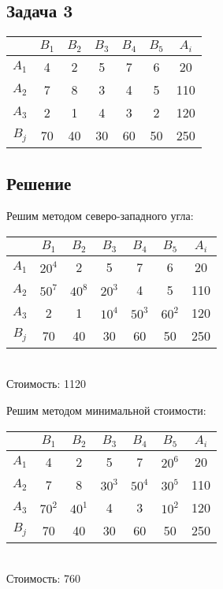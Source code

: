 \documentclass[12pt]{article}
\begin{document}
\subsection*{Задача 3}
\begin{table}[h!]
\begin{center}
\begin{tabular}{|c|c|c|c|c|c|c|}
\hline
           & $B_1$ & $B_2$ & $B_3$ & $B_4$ & $B_5$ & $A_i$	\\
\hline
 $A_1$ & 4 & 2 & 5 & 7 & 6 & 20	\\
\hline
 $A_2$ & 7 & 8 & 3 & 4 & 5 & 110	\\
\hline
 $A_3$ & 2 & 1 & 4 & 3 & 2 & 120	\\
\hline
 $B_j$ & 70 & 40 & 30 & 60 & 50 & 250	\\
\hline
\end{tabular}
\end{center}
\end{table} 
\subsection*{Решение}
Решим методом северо-западного угла:
\begin{table}[h!]
\begin{center}
\begin{tabular}{|c|c|c|c|c|c|c|}
\hline
           & $B_1$ & $B_2$ & $B_3$ & $B_4$ & $B_5$ & $A_i$	\\
\hline
 $A_1$ & $20^4$ & 2 & 5 & 7 & 6 & 20	\\
\hline
 $A_2$ & $50^7$ & $40^8$ & $20^3$ & 4 & 5 & 110	\\
\hline
 $A_3$ & 2 & 1 & $10^4$ & $50^3$ & $60^2$ & 120	\\
\hline
 $B_j$ & 70 & 40 & 30 & 60 & 50 & 250	\\
\hline
\end{tabular}\\

Стоимость: 1120
\end{center}
\end{table} 

Решим методом минимальной стоимости:
\begin{table}[h!]
\begin{center}
\begin{tabular}{|c|c|c|c|c|c|c|}
\hline
           & $B_1$ & $B_2$ & $B_3$ & $B_4$ & $B_5$ & $A_i$	\\
\hline
 $A_1$ & 4 & 2 & 5 & 7 & $20^6$ & 20	\\
\hline
 $A_2$ & 7 & 8 & $30^3$ & $50^4$ & $30^5$ & 110	\\
\hline
 $A_3$ & $70^2$ & $40^1$ & 4 & 3 & $10^2$ & 120	\\
\hline
 $B_j$ & 70 & 40 & 30 & 60 & 50 & 250	\\
\hline
\end{tabular}\\
Стоимость: 760
\end{center}
\end{table} 
\newpage
\end{document}
